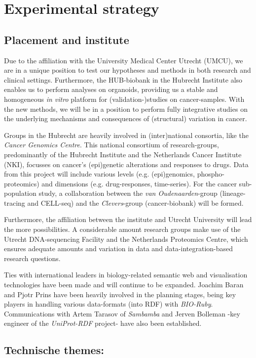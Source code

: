 \documentclass[twoside,fontsize=12pt]{article}
\begin{document}
\section*{Experimental strategy}
\subsection*{Placement and institute}
Due to the affiliation with the University Medical Center Utrecht (UMCU), we are in a unique position to test our hypotheses and methods in both research and clinical settings. Furthermore, the HUB-biobank in the Hubrecht Institute also enables us to perform analyses on organoids, providing us a stable and homogeneous \textit{in vitro} platform for (validation-)studies on cancer-samples. With the new methods, we will be in a position to perform fully integrative studies on the underlying mechanisms and consequences of (structural) variation in cancer. 

Groups in the Hubrecht are heavily involved in (inter)national consortia, like the \textit{Cancer Genomics Centre}. This national consortium of research-groups, predominantly of the Hubrecht Institute and the Netherlands Cancer Institute (NKI), focusses on cancer's (epi)genetic alterations and responses to drugs. Data from this project will include various levels (e.g. (epi)genomics, phospho-proteomics) and dimensions (e.g. drug-responses, time-series). For the cancer sub-population study, a collaboration between the \textit{van Oudenaarden}-group (lineage-tracing and CELL-seq) and the \textit{Clevers}-group (cancer-biobank) will be formed.

Furthermore, the affiliation between the institute and Utrecht University will lead the more possibilities. A considerable amount research groups make use of the Utrecht DNA-sequencing Facility and the Netherlands Proteomics Centre, which ensures adequate amounts and variation in data and data-integration-based research questions. 

Ties with international leaders in biology-related semantic web and visualisation technologies have been made and will continue to be expanded. Joachim Baran and Pjotr Prins have been heavily involved in the planning stages, being key players in handling various data-formats (into RDF) with \textit{BIO-Ruby}. Communications with Artem Tarasov of \textit{Sambamba} and Jerven Bolleman -key engineer of the \textit{UniProt-RDF} project- have also been established.


\subsection*{		Technische themes:}
\end{document}
